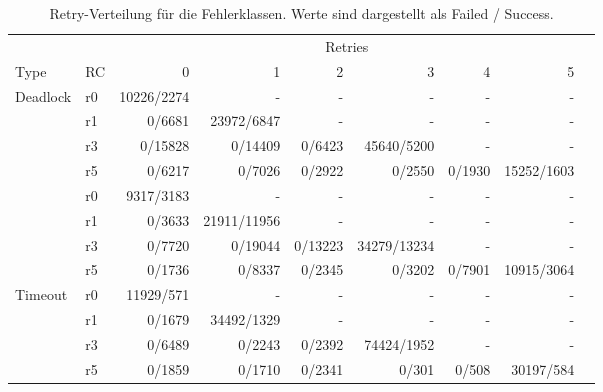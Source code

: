\begin{table}[htbp]
	\centering
	\caption{Retry-Verteilung für die Fehlerklassen.
	Werte sind dargestellt als Failed / Success.}
	\label{tab:r-retryDistribution}
	\footnotesize
	\setlength{\tabcolsep}{3pt}

	\begin{tabular}{llrrrrrrr}
		\toprule
		& & \multicolumn{6}{c}{Retries} & \\
		Type & RC & 0 & 1 & 2 & 3 & 4 & 5 \\
		\midrule

		\multirow{5}{*}{Deadlock}
		& r0
		& 10226/2274 & - & -
		& - & - & - \\

		& r1
		& 0/6681 & 23972/6847 & -
		& - & - & - \\

		& r3
		& 0/15828 & 0/14409 & 0/6423
		& 45640/5200 & - & - \\

		& r5
		& 0/6217 & 0/7026 & 0/2922
		& 0/2550 & 0/1930 & 15252/1603 \\

		\midrule

		\multirow{5}{*}{Serialization}
		& r0
		& 9317/3183 & - & -
		& - & - & - \\

		& r1
		& 0/3633 & 21911/11956 & -
		& - & - & - \\

		& r3
		& 0/7720 & 0/19044 & 0/13223
		& 34279/13234 & - & - \\

		& r5
		& 0/1736 & 0/8337 & 0/2345
		& 0/3202 & 0/7901 & 10915/3064 \\

		\midrule

		\multirow{5}{*}{Timeout}
		& r0
		& 11929/571 & - & -
		& - & - & - \\

		& r1
		& 0/1679 & 34492/1329 & -
		& - & - & - \\

		& r3
		& 0/6489 & 0/2243 & 0/2392
		& 74424/1952 & - & - \\

		& r5
		& 0/1859 & 0/1710 & 0/2341
		& 0/301 & 0/508 & 30197/584 \\

		\bottomrule
	\end{tabular}
	\vspace{0.3em}
\end{table}